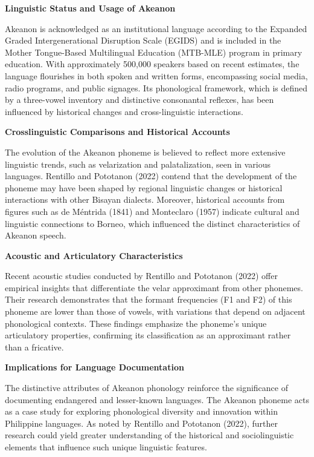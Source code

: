 \textbf{Linguistic Status and Usage of Akeanon }
 
Akeanon is acknowledged as an institutional language according to the Expanded Graded Intergenerational Disruption Scale (EGIDS) and is included in the Mother Tongue-Based Multilingual Education (MTB-MLE) program in primary education. With approximately 500,000 speakers based on recent estimates, the language flourishes in both spoken and written forms, encompassing social media, radio programs, and public signages. Its phonological framework, which is defined by a three-vowel inventory and distinctive consonantal reflexes, has been influenced by historical changes and cross-linguistic interactions.

\textbf{Crosslinguistic Comparisons and Historical Accounts}
  
The evolution of the Akeanon phoneme is believed to reflect more extensive linguistic trends, such as velarization and palatalization, seen in various languages. Rentillo and Pototanon (2022) contend that the development of the phoneme may have been shaped by regional linguistic changes or historical interactions with other Bisayan dialects. Moreover, historical accounts from figures such as de Méntrida (1841) and Monteclaro (1957) indicate cultural and linguistic connections to Borneo, which influenced the distinct characteristics of Akeanon speech.

\textbf{Acoustic and Articulatory Characteristics}  

Recent acoustic studies conducted by Rentillo and Pototanon (2022) offer empirical insights that differentiate the velar approximant from other phonemes. Their research demonstrates that the formant frequencies (F1 and F2) of this phoneme are lower than those of vowels, with variations that depend on adjacent phonological contexts. These findings emphasize the phoneme's unique articulatory properties, confirming its classification as an approximant rather than a fricative.

\textbf{Implications for Language Documentation}  

The distinctive attributes of Akeanon phonology reinforce the significance of documenting endangered and lesser-known languages. The Akeanon phoneme acts as a case study for exploring phonological diversity and innovation within Philippine languages. As noted by Rentillo and Pototanon (2022), further research could yield greater understanding of the historical and sociolinguistic elements that influence such unique linguistic features.

